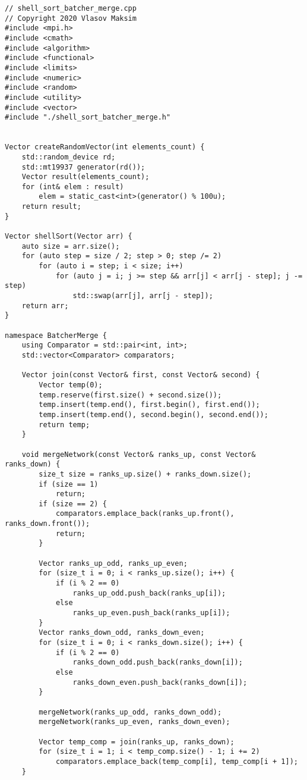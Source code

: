 \documentclass{report}
\begin{document}
\begin{lstlisting}
// shell_sort_batcher_merge.cpp
// Copyright 2020 Vlasov Maksim
#include <mpi.h>
#include <cmath>
#include <algorithm>
#include <functional>
#include <limits>
#include <numeric>
#include <random>
#include <utility>
#include <vector>
#include "./shell_sort_batcher_merge.h"


Vector createRandomVector(int elements_count) {
    std::random_device rd;
    std::mt19937 generator(rd());
    Vector result(elements_count);
    for (int& elem : result)
        elem = static_cast<int>(generator() % 100u);
    return result;
}

Vector shellSort(Vector arr) {
    auto size = arr.size();
    for (auto step = size / 2; step > 0; step /= 2)
        for (auto i = step; i < size; i++)
            for (auto j = i; j >= step && arr[j] < arr[j - step]; j -= step)
                std::swap(arr[j], arr[j - step]);
    return arr;
}

namespace BatcherMerge {
    using Comparator = std::pair<int, int>;
    std::vector<Comparator> comparators;

    Vector join(const Vector& first, const Vector& second) {
        Vector temp(0);
        temp.reserve(first.size() + second.size());
        temp.insert(temp.end(), first.begin(), first.end());
        temp.insert(temp.end(), second.begin(), second.end());
        return temp;
    }

    void mergeNetwork(const Vector& ranks_up, const Vector& ranks_down) {
        size_t size = ranks_up.size() + ranks_down.size();
        if (size == 1)
            return;
        if (size == 2) {
            comparators.emplace_back(ranks_up.front(), ranks_down.front());
            return;
        }

        Vector ranks_up_odd, ranks_up_even;
        for (size_t i = 0; i < ranks_up.size(); i++) {
            if (i % 2 == 0)
                ranks_up_odd.push_back(ranks_up[i]);
            else
                ranks_up_even.push_back(ranks_up[i]);
        }
        Vector ranks_down_odd, ranks_down_even;
        for (size_t i = 0; i < ranks_down.size(); i++) {
            if (i % 2 == 0)
                ranks_down_odd.push_back(ranks_down[i]);
            else
                ranks_down_even.push_back(ranks_down[i]);
        }

        mergeNetwork(ranks_up_odd, ranks_down_odd);
        mergeNetwork(ranks_up_even, ranks_down_even);

        Vector temp_comp = join(ranks_up, ranks_down);
        for (size_t i = 1; i < temp_comp.size() - 1; i += 2)
            comparators.emplace_back(temp_comp[i], temp_comp[i + 1]);
    }


\end{lstlisting}
\end{document}
